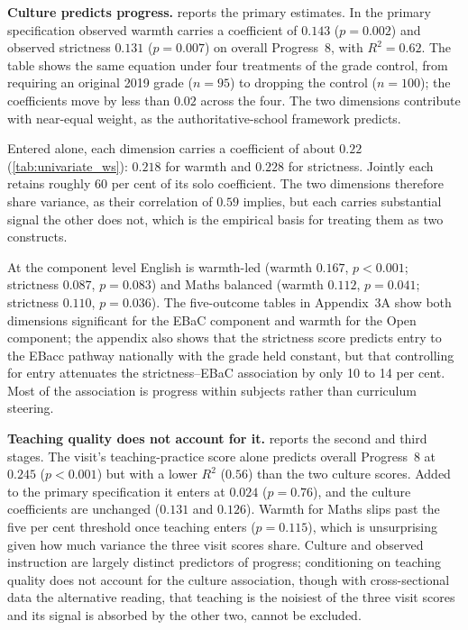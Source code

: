 \textbf{Culture predicts progress.}  reports the
primary estimates. In the primary specification observed warmth carries a
coefficient of $0.143$ ($p = 0.002$) and observed strictness $0.131$
($p = 0.007$) on overall Progress~8, with $R^2 = 0.62$. The table shows the
same equation under four treatments of the grade control, from requiring an
original 2019 grade ($n = 95$) to dropping the control ($n = 100$); the
coefficients move by less than $0.02$ across the four. The two dimensions
contribute with near-equal weight, as the authoritative-school framework
predicts.



Entered alone, each dimension carries a coefficient of about $0.22$
(\cref{tab:univariate_ws}): $0.218$ for warmth and $0.228$ for strictness.
Jointly each retains roughly 60 per cent of its solo coefficient. The two
dimensions therefore share variance, as their correlation of $0.59$ implies,
but each carries substantial signal the other does not, which is the
empirical basis for treating them as two constructs.



At the component level English is warmth-led (warmth $0.167$, $p < 0.001$;
strictness $0.087$, $p = 0.083$) and Maths balanced (warmth $0.112$,
$p = 0.041$; strictness $0.110$, $p = 0.036$). The five-outcome tables in
Appendix~3A show both dimensions significant for the EBaC component and
warmth for the Open component; the appendix also shows that the strictness
score predicts entry to the EBacc pathway nationally with the grade held
constant, but that controlling for entry attenuates the strictness--EBaC
association by only 10 to 14 per cent. Most of the association is progress
within subjects rather than curriculum steering.

\textbf{Teaching quality does not account for it.} 
reports the second and third stages. The visit's teaching-practice score alone
predicts overall Progress~8 at $0.245$ ($p < 0.001$) but with a lower $R^2$
($0.56$) than the two culture scores. Added to the primary specification it
enters at $0.024$ ($p = 0.76$), and the culture coefficients are unchanged
($0.131$ and $0.126$). Warmth for Maths slips past the five per cent threshold
once teaching enters ($p = 0.115$), which is unsurprising given how much
variance the three visit scores share. Culture and observed instruction are
largely distinct predictors of progress; conditioning on teaching quality does
not account for the culture association, though with cross-sectional data the
alternative reading, that teaching is the noisiest of the three visit scores
and its signal is absorbed by the other two, cannot be excluded.

